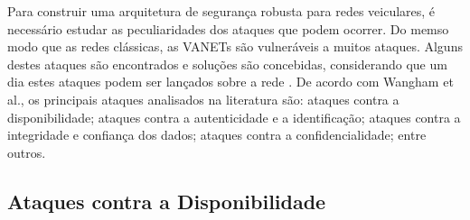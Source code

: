 \documentclass[
	12pt,				%
	oneside,			%
	a4paper,			%
	english,			%
	brazil				%
	]{abntex2ppgsi}
\begin{document}
Para construir uma arquitetura de segurança robusta para redes veiculares, é necessário estudar as peculiaridades dos ataques que podem ocorrer. Do memso modo que as redes clássicas, as VANETs são vulneráveis a muitos ataques. Alguns destes ataques são encontrados e soluções são concebidas, considerando que um dia estes ataques podem ser lançados sobre a rede \cite{engoulou2014vanet}. De acordo com Wangham et al.,  os principais ataques analisados na literatura são: ataques contra a disponibilidade; ataques contra a autenticidade e a identificação; ataques contra a integridade e confiança dos dados; ataques contra a confidencialidade; entre outros.

\subsection{Ataques contra a Disponibilidade}
\end{document}
